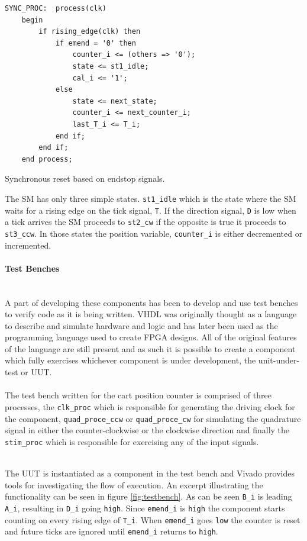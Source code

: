 \begin{listing}[H]
\begin{verbatim}
SYNC_PROC:  process(clk)
	begin
	    if rising_edge(clk) then
	        if emend = '0' then
	            counter_i <= (others => '0');
	            state <= st1_idle;
	            cal_i <= '1';
	        else
	            state <= next_state;
	            counter_i <= next_counter_i;
	            last_T_i <= T_i;
	        end if;
	    end if;
	end process;
\end{verbatim}
\caption{Synchronous reset based on endstop signals.}
\label{code:cart_sync_proc}
\end{listing}

The SM has only three simple states.
\texttt{st1\_idle} which is the state where the SM waits for a rising edge on the tick signal, \texttt{T}.
If the direction signal, \texttt{D} is low when a tick arrives the SM proceeds to \texttt{st2\_cw} if the opposite is true it proceeds to \texttt{st3\_ccw}.
In those states the position variable, \texttt{counter\_i} is either decremented or incremented.

\paragraph{Test Benches}~\\ %
\label{par:test_benches}
A part of developing these components has been to develop and use test benches to verify code as it is being written.
VHDL was originally thought as a language to describe and simulate hardware and logic and has later been used as the programming language used to create FPGA designs.
All of the original features of the language are still present and as such it is possible to create a component which fully exercises whichever component is under development, the unit-under-test or UUT.
\\~\\
The test bench written for the cart position counter is comprised of three processes, the \texttt{clk\_proc} which is responsible for generating the driving clock for the component, \texttt{quad\_proce\_ccw} or \texttt{quad\_proce\_cw} for simulating the quadrature signal in either the counter-clockwise or the clockwise direction and finally the \texttt{stim\_proc} which is responsible for exercising any of the input signals.
\\~\\

The UUT is instantiated as a component in the test bench and Vivado provides tools for investigating the flow of execution.
An excerpt illustrating the functionality can be seen in figure \ref{fig:testbench}.
As can be seen \texttt{B\_i} is leading \texttt{A\_i}, resulting in \texttt{D\_i} going \texttt{high}.
Since \texttt{emend\_i} is \texttt{high} the component starts counting on every rising edge of \texttt{T\_i}.
When \texttt{emend\_i} goes \texttt{low} the counter is reset and future ticks are ignored until \texttt{emend\_i} returns to \texttt{high}.

